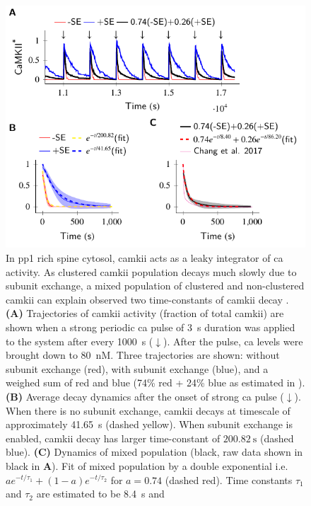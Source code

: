 \documentclass[9pt,lineno]{elife}
\begin{document}
\begin{figure}%
    \includegraphics[width=11.4cm]{PaperFigures/elifeFigure6/figure_two_timecourses_114mm.pdf}
    \caption{ In \gls{pp1} rich spine cytosol, \gls{camkii} acts as a leaky integrator of \gls{ca} 
        activity. As clustered \gls{camkii} population decays much slowly due
        to subunit exchange, a mixed population of clustered and non-clustered \gls{camkii}
        can explain observed two time-constants of \gls{camkii} decay \citep{chang_camkii_2017}.
        \textbf{(A)} Trajectories of \gls{camkii} activity (fraction of total \gls{camkii})
        are shown when a strong periodic \gls{ca} pulse of \SI{3}{\second}
        duration was applied to the system after every \SI{1000}{\second} ($\downarrow$).
        After the pulse, \gls{ca} levels were brought down to \SI{80}{\nano M}. 
        Three trajectories are shown: without subunit exchange (red), with
        subunit exchange (blue), and a weighed sum of red and blue (74\%
        red + 24\% blue as estimated in \citep{chang_camkii_2017}). 
        \textbf{(B)} Average decay dynamics after the onset of strong \gls{ca} pulse ($\downarrow$). 
        When there is no subunit exchange, \gls{camkii} decays at timescale of
        approximately \SI{41.65}{\second} (dashed yellow). When subunit exchange is enabled, 
        \gls{camkii} decay has larger time-constant of $\SI{200.82}{\second}$ (dashed blue). 
        \textbf{(C)} Dynamics of mixed population (black, raw data shown in
        black in \textbf{A}). Fit of mixed population by a double
        exponential i.e. $ae^{-t/\tau_{1}}+(1-a)e^{-t/\tau_{2}}$ for
        $a=0.74$ (dashed red). Time constants $\tau_1$ and $\tau_2$ are estimated to be \SI{8.4}{\second} and
}
\end{figure}
\end{document}
